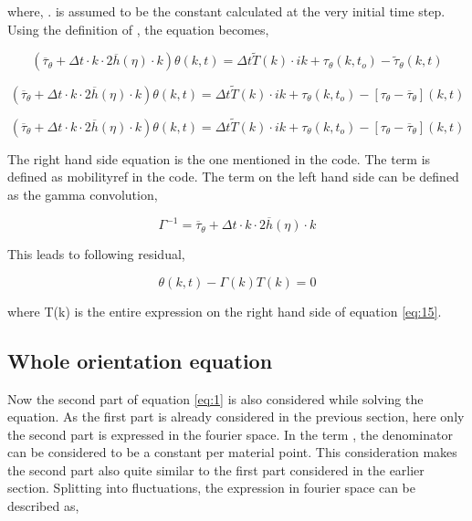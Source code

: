 \documentclass[a4paper,11pt,dvipsnames]{article}
\begin{document}
where, . 
 is assumed to be the constant  calculated at the very initial time step. 
Using the definition of \mathsym{\tau_\theta = \overline{\tau}_\theta + \tilde{\tau}_\theta}, the equation becomes, 

\begin{equation}
\left ( \overline{\tau}_\theta + \Delta t \cdot k \cdot 2 \overline{h} (\eta) \cdot k \right ) \theta (k,t) = 
\Delta t \tilde{T}(k) \cdot ik + \tau_\theta (k,t_o) - \tilde{\tau}_\theta (k,t) \label{eq:16}
\end{equation}

\begin{equation}
\left ( \overline{\tau}_\theta + \Delta t \cdot k \cdot 2 \overline{h} (\eta) \cdot k \right ) \theta (k,t) = 
\Delta t \tilde{T}(k) \cdot ik + \tau_\theta (k,t_o) - \left [ \tau_\theta - \overline{\tau}_\theta \right ] (k,t) \label{eq:17}
\end{equation}

\begin{equation}
\left ( \overline{\tau}_\theta + \Delta t \cdot k \cdot 2 \overline{h} (\eta) \cdot k \right ) \theta (k,t) = 
\Delta t \tilde{T}(k) \cdot ik + \tau_\theta (k,t_o) - \left [ \tau_\theta - \overline{\tau}_\theta \right ] (k,t) \label{eq:18}
\end{equation}

The right hand side equation is the one mentioned in the code. 
The term  is defined as mobility\textunderscore ref in the code. 
The term on the left hand side can be defined as the gamma convolution, 

\begin{equation}
    \Gamma^{-1} = \overline{\tau}_\theta + \Delta t \cdot k \cdot 2 \overline{h} (\eta) \cdot k \label{eq:19}
\end{equation}

This leads to following residual, 

\begin{equation}
    \theta (k,t) - \Gamma (k) T(k) = 0 \label{eq:20}
\end{equation}

where T(k) is the entire expression on the right hand side of equation \ref{eq:15}. 

\subsection{Whole orientation equation}
Now the second part of equation \ref{eq:1} is also considered while solving the equation. 
As the first part is already considered in the previous section, here only the second part is expressed in the fourier space. 
In the term \mathsym{\frac{\nabla \theta}{\left | \nabla \theta \right |}}, the denominator can be considered to be a constant 
per material point. 
This consideration makes the second part also quite similar to the first part considered in the earlier section. 
Splitting into fluctuations, the expression in fourier space can be described as,
\end{document}
